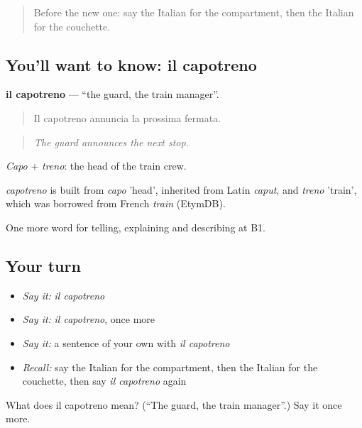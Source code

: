 \label{lesson:IT-C419-capotreno}



\begin{quote}
Before the new one: say the Italian for the compartment, then the Italian for the couchette.
\end{quote}

\subsection*{You'll want to know: il capotreno}
\textbf{il capotreno} — \textquotedblleft{}the guard, the train manager\textquotedblright{}.

\begin{quote}
Il capotreno annuncia la prossima fermata.
\end{quote}

\begin{quote}
\emph{The guard announces the next stop.}
\end{quote}

\emph{Capo} + \emph{treno}: the head of the train crew.

\begin{cousinweb}
\emph{capotreno} is built from \emph{capo} 'head', inherited from Latin \emph{caput}, and \emph{treno} 'train', which was borrowed from French \emph{train} (EtymDB).
\end{cousinweb}

\begin{grammarlens}[title={What you've built}]
One more word for telling, explaining and describing at B1.
\end{grammarlens}

\subsection*{Your turn}
\begin{itemize}
\raggedright
  \item \emph{Say it:} \emph{il capotreno}
  \item \emph{Say it:} \emph{il capotreno}, once more
  \item \emph{Say it:} a sentence of your own with \emph{il capotreno}
  \item \emph{Recall:} say the Italian for the compartment, then the Italian for the couchette, then say \emph{il capotreno} again
\end{itemize}

\begin{tcolorbox}[breakable,colback=teal!4,colframe=teal!35!black,title={Before you move on}]
What does il capotreno mean? (\textquotedblleft{}The guard, the train manager\textquotedblright{}.) Say it once more.
\end{tcolorbox}
